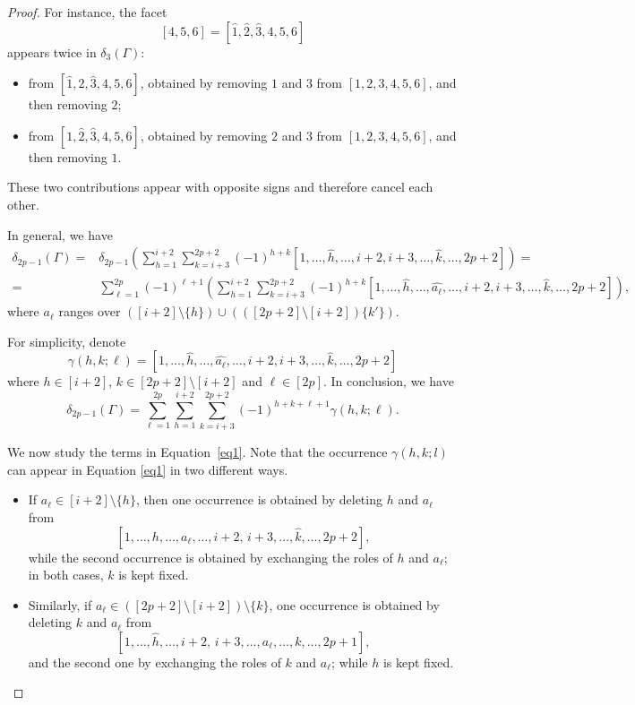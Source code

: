 \documentclass[12pt]{amsart}
\begin{document}
\begin{proof}
\noindent For instance, the facet
\[
[4,5,6] = [\widehat{1},\widehat{2},\widehat{3},4,5,6]
\]
appears twice in $\delta_3(\Gamma)$:
\begin{itemize}
\item from $[\widehat{1},2,\widehat{3},4,5,6]$, obtained by removing $1$ and $3$ from $[1,2,3,4,5,6]$, and then removing $2$;
\item from $[1,\widehat{2},\widehat{3},4,5,6]$, obtained by removing $2$ and $3$ from $[1,2,3,4,5,6]$, and then removing $1$.
\end{itemize}
These two contributions appear with opposite signs and therefore cancel each other.



In general, we have
\begin{equation*}
\begin{aligned}
\delta_{2p-1}(\Gamma)
 = {} & \delta_{2p-1}\left(
 \sum_{h=1}^{i+2} \sum_{k=i+3}^{2p+2} (-1)^{h+k}
 \left[1,\dots,\widehat{h},\dots,i+2,i+3,\dots,\widehat{k},\dots,2p+2 \right]
 \right)= \\
={} & \sum_{\ell=1}^{2p} (-1)^{\ell+1} \left(\sum_{h=1}^{i+2} \sum_{k=i+3}^{2p+2} (-1)^{h+k}
\left[1,\dots,\widehat{h},\dots,\widehat{a_\ell},\dots,i+2,i+3,\dots,\widehat{k},\dots,2p+2 \right]
\right),
\end{aligned}
\end{equation*}
where $a_\ell$ ranges over
$([i+2]\setminus\{h\}) \cup (([2p+2]\setminus[i+2])\{k'\})$. 

For simplicity, denote
$$
\gamma(h,k;\ell)=\left[1,\dots,\widehat{h},\dots,\widehat{a_\ell},\dots,i+2,i+3,\dots,\widehat{k},\dots,2p+2 \right]
$$
where $h\in [i+2]$, $k \in [2p+2]\setminus[i+2]$ and $\ell \in [2p]$. In conclusion, we have
\begin{equation}\label{eq1}
\delta_{2p-1}(\Gamma)= \sum_{\ell=1}^{2p} \sum_{h=1}^{i+2} \sum_{k=i+3}^{2p+2} (-1)^{h+k+\ell+1} \gamma(h,k;\ell).
\end{equation}

We now study the terms in Equation~\eqref{eq1}. Note that the occurrence $\gamma(h,k;l)$ can appear in Equation \eqref{eq1} in two different ways. 
\begin{itemize}
    \item If $a_{\ell}\in [i+2]\setminus\{h\}$, then one occurrence is obtained by deleting
$h$ and $a_{\ell}$ from $$\left[1,\dots,h,\dots, a_{\ell}, \dots, i+2,\,i+3,\dots,\widehat{k},\dots, 2p+2\right],$$ while the second occurrence is obtained by exchanging the roles of $h$ and $a_{\ell}$;
in both cases, $k$ is kept fixed.
    \item Similarly, if $a_{\ell}\in ([2p+2]\setminus[i+2])\setminus\{k\}$, one occurrence is obtained by deleting
$k$ and $a_{\ell}$ from $$\left[1,\dots,\widehat{h}, \dots, i+2,\,i+3,\dots,a_{\ell},\dots,k,\dots, 2p+1\right],$$ and the second one by exchanging the roles of $k$ and $a_{\ell}$; while $h$ is kept fixed.
\end{itemize}


\end{proof}
\end{document}

